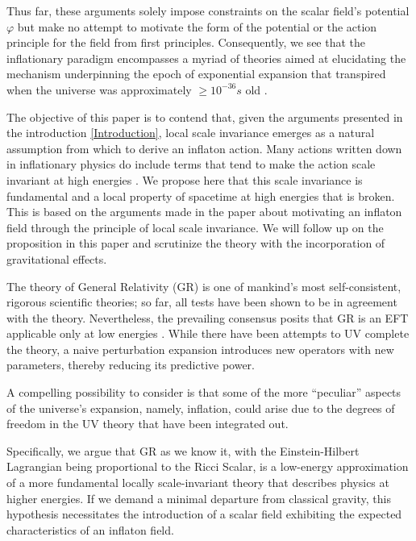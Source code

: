 \documentclass[aps,prd,reprint,preprintnumbers,showpacs,floatfix,nofootinbib,superscript address]{revtex4-2}
\begin{document}
Thus far, these arguments solely impose constraints on the scalar field's potential $\varphi$ but make no attempt to motivate the form of the potential or the action principle for the field from first principles. Consequently, we see that the inflationary paradigm encompasses a myriad of theories aimed at elucidating the mechanism underpinning the epoch of exponential expansion that transpired when the universe was approximately $\geq 10^{-36}s$ old \cite{Mukhanov:2005sc, Baumann_2022}.

The objective of this paper is to contend that, given the arguments presented in the introduction \ref{Introduction}, local scale invariance emerges as a natural assumption from which to derive an inflaton action. Many actions written down in inflationary physics do include terms that tend to make the action scale invariant at high energies \cite{STAROBINSKY198099, karananas_geometrical_2016, Salvio_2022, Karananas:2025xcv, ferreira_inflation_2018, ferreira_inertial_2018, ferreira_weyl_2017, csaki_inflation_2014, rubio_emergent_2017}. We propose here that this scale invariance is fundamental and a local property of spacetime at high energies that is broken. This is based on the arguments made in the paper \cite{barker2024poincaregaugetheoryconformal} about motivating an inflaton field through the principle of local scale invariance. We will follow up on the proposition in this paper and scrutinize the theory with the incorporation of gravitational effects.

The theory of General Relativity (GR) is one of mankind's most self-consistent, rigorous scientific theories; so far, all tests have been shown to be in agreement with the theory. Nevertheless, the prevailing consensus posits that GR is an EFT applicable only at low energies \cite{donoghue_general_1994, burgess_quantum_2004}. While there have been attempts to UV complete the theory, a naive perturbation expansion introduces new operators with new parameters, thereby reducing its predictive power.

A compelling possibility to consider is that some of the more ``peculiar'' aspects of the universe's expansion, namely, inflation, could arise due to the degrees of freedom in the UV theory that have been integrated out. 

Specifically, we argue that GR as we know it, with the Einstein-Hilbert Lagrangian being proportional to the Ricci Scalar, is a low-energy approximation of a more fundamental locally scale-invariant theory that describes physics at higher energies. If we demand a minimal departure from classical gravity, this hypothesis necessitates the introduction of a scalar field exhibiting the expected characteristics of an inflaton field.
\end{document}
